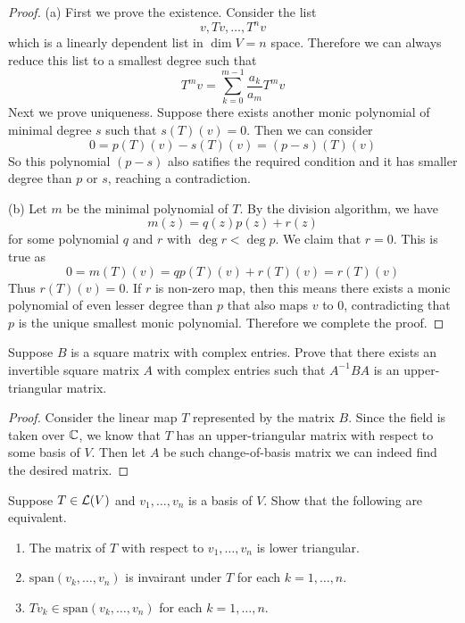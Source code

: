 \documentclass{extarticle}
\begin{document}
\begin{proof}
(a) First we prove the existence. Consider the list 
\[v, Tv, \ldots, T^n v\] 
which is a linearly dependent list in \(\dim V = n\) space. Therefore we can always reduce this list 
to a smallest degree such that 
\[T^m v = \sum_{k=0}^{m-1}\frac{a_k}{a_m}T^m v\]
Next we prove uniqueness. Suppose there exists another monic polynomial of minimal degree 
\(s\) such that \(s(T)(v) = 0\). Then we can consider 
\[0 = p(T)(v) - s(T)(v) = (p - s)(T)(v)\]
So this polynomial \((p - s)\) also satifies the required condition and it has smaller degree 
than \(p\) or \(s\), reaching a contradiction. 


(b) Let \(m\) be the minimal polynomial of \(T\). By the division algorithm, we have 
\[m(z) = q(z)p(z) + r(z)\]
for some polynomial \(q\) and \(r\) with \(\deg r < \deg p\). We claim that \(r = 0\). This is true as 
\[0 = m(T)(v) = qp(T)(v) + r(T)(v) = r(T)(v)\]
Thus \(r(T)(v) = 0\). If \(r\) is non-zero map, then this means there exists a monic polynomial of even 
lesser degree than \(p\) that also maps \(v\) to 0, 
contradicting that \(p\) is the unique smallest monic polynomial. Therefore we complete the proof.
\end{proof}



\begin{problem}{9}
    Suppose \(B\) is a square matrix with complex entries. Prove that there exists an invertible square 
    matrix \(A\) with complex entries such that \(A^{-1}BA\) is an upper-triangular matrix.
\end{problem}

\begin{proof}
Consider the linear map \(T\) represented by the matrix \(B\). Since the field is taken over \(\mathbb{C}\), we know 
that \(T\) has an upper-triangular matrix with respect to some basis of \(V\). Then let \(A\) be such 
change-of-basis matrix we can indeed find the desired matrix. 
\end{proof}


\begin{problem}{10}
    Suppose \(T \in \mathcal{L}(V)\) and \(v_1, \ldots, v_n\) is a basis of \(V\). Show that the following are 
    equivalent. 

    \begin{enumerate}[label=(\alph*)]
        \item The matrix of \(T\) with respect to \(v_1, \ldots, v_n\) is lower triangular. 
        \item \(\text{span}(v_k, \ldots, v_n)\) is invairant under \(T\) for each \(k = 1, \ldots, n\). 
        \item \(Tv_k \in \text{span}(v_k, \ldots, v_n)\) for each \(k = 1, \ldots, n\).
    \end{enumerate}
\end{problem}
\end{document}
